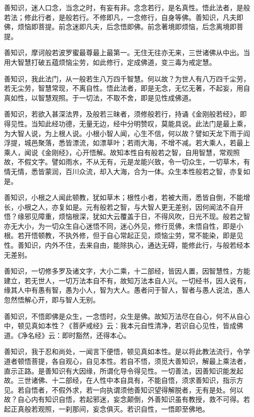 \documentclass[12pt,twoside,openany]{book}
\begin{document}
善知识，迷人口念，当念之时，有妄有非。念念若行，是名真性。悟此法者，是般若法；修此行者，是般若行。不修即凡，一念修行，自身等佛。善知识，凡夫即佛，烦恼即菩提。前念迷即凡夫，后念悟即佛。前念著境即烦恼，后念离境即菩提。

善知识，摩诃般若波罗蜜最尊最上最第一。无住无往亦无来，三世诸佛从中出。当用大智慧打破五蕴烦恼尘劳，如此修行，定成佛道，变三毒为戒定慧。

善知识，我此法门，从一般若生八万四千智慧。何以故？为世人有八万四千尘劳，若无尘劳，智慧常现，不离自性。悟此法者，即是无念，无忆无著，不起妄，用自真如性，以智慧观照。于一切法，不取不舍，即是见性成佛道。

善知识，若欲入甚深法界，及般若三昧者，须修般若行，持诵《金刚般若经》，即得见性。当知此经功德，无量无边，经中分明赞叹，莫能具说。此法门是最上乘，为大智人说，为上根人说。小根小智人闻，心生不信，何以故？譬如天龙下雨于阎浮提，城邑聚落，悉皆漂流，如漂草叶；若雨大海，不增不减。若大乘人，若最上乘人，闻说《金刚经》，心开悟解。故知本性自有般若之智，自用智慧，常观照故，不假文字。譬如雨水，不从无有，元是龙能兴致，令一切众生，一切草木，有情无情，悉皆蒙润，百川众流，却入大海，合为一体。众生本性般若之智，亦复如是。

善知识，小根之人闻此顿教，犹如草木；根性小者，若被大雨，悉皆自倒，不能增长，小根之人，亦复如是。元有般若之智，与大智人更无差别，因何闻法不自开悟？缘邪见障重，烦恼根深，犹如大云覆盖于日，不得风吹，日光不现。般若之智亦无大小，为一切众生自心迷悟不同，迷心外见，修行觅佛，未悟自性，即是小根。若开悟顿教，不执外修，但于自心常起正见，烦恼尘劳，常不能染，即是见性。善知识，内外不住，去来自由，能除执心，通达无碍，能修此行，与般若经本无差别。

善知识，一切修多罗及诸文字，大小二乘，十二部经，皆因人置，因智慧性，方能建立，若无世人，一切万法本自不有，故知万法本自人兴。一切经书，因人说有，缘其人中有愚有智，愚为小人，智为大人。愚者问于智人，智者与愚人说法，愚人忽然悟解心开，即与智人无别。

善知识，不悟即佛是众生，一念悟时，众生是佛。故知万法尽在自心，何不从自心中，顿见真如本性？《菩萨戒经》云：我本元自性清净，若识自心见性，皆成佛道。《净名经》云：即时豁然，还得本心。

善知识，我于忍和尚处，一闻言下便悟，顿见真如本性。是以将此教法流行，令学道者顿悟菩提，各自观心，自见本性。若自不悟，须觅大善知识，解最上乘法者，直示正路。是善知识有大因缘，所谓化导令得见性。一切善法，因善知识能发起故。三世诸佛、十二部经，在人性中本自具有，不能自悟，须求善知识，指示方见。若自悟者，不假外求，若一向执谓须他善知识望得解脱者，无有是处。何以故？自心内有知识自悟，若起邪迷，妄念颠倒，外善知识虽有教授，救不可得。若起正真般若观照，一刹那间，妄念俱灭。若识自性，一悟即至佛地。
\end{document}
